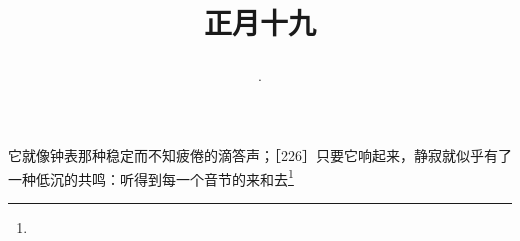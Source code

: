 \title{\date[d=28,m=2,y=2024][year:cn-y,年,month:cn,day:cn,日,·,weekday]·正月十九 }
它就像钟表那种稳定而不知疲倦的滴答声；［226］只要它响起来，静寂就似乎有了一种低沉的共鸣：听得到每一个音节的来和去\footnote{ }

